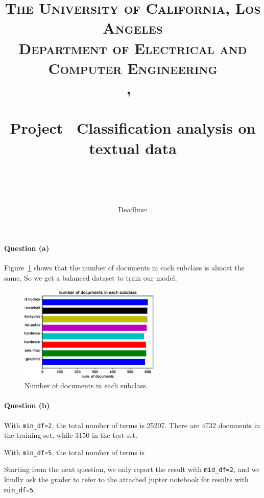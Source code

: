 \documentclass[letterpaper]{article}
\title{\normalfont \normalsize
\textsc{The University of California, Los Angeles \\
Department of Electrical and Computer Engineering \\
\coursename,~\quarter} \\ [25pt]
\horrule{0.5pt} \\[0.5cm]
{\myfont Project \hwnumber~Classification analysis on textual data}
\\[0.2cm]
\horrule{2pt} \\[0.3cm]
}
\author{\normalfont \normalsize \authorname \\[-3pt]}
\date{\normalfont \normalsize Deadline: \deadline}
\begin{document}
\maketitle

\paragraph{Question (a)}
Figure~\ref{fig:histogram} shows that the number of documents
in each subclass is almost the same.
So we get a balanced dataset to train our model.

\begin{figure}[H]
\centering
\includegraphics[width=0.6\textwidth]{histogram}
\caption{Number of documents in each subclass.}
\label{fig:histogram}
\end{figure}

\paragraph{Question (b)}
With \texttt{min\_df=2}, the total number of terms is 25207.
There are 4732 documents in the training set,
while $3150$ in the test set.

With \texttt{min\_df=5}, the total number of terms is 

Starting from the next question,
we only report the result with \texttt{mid\_df=2},
and we kindly ask the grader to refer to the attached
jupter notebook for results with \texttt{min\_df=5}.

\clearpage
\end{document}
